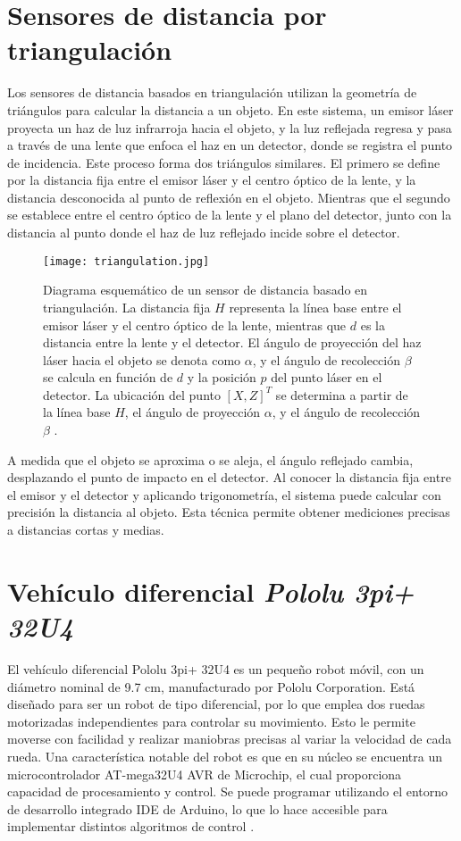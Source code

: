 \section{Sensores de distancia por triangulación}
Los sensores de distancia basados en triangulación utilizan la geometría de triángulos para calcular la distancia a un objeto. En este sistema, un emisor láser proyecta un haz de luz infrarroja hacia el objeto, y la luz reflejada regresa y pasa a través de una lente que enfoca el haz en un detector, donde se registra el punto de incidencia. Este proceso forma dos triángulos similares. El primero se define por la distancia fija entre el emisor láser y el centro óptico de la lente, y la distancia desconocida al punto de reflexión en el objeto. Mientras que el segundo se establece entre el centro óptico de la lente y el plano del detector, junto con la distancia al punto donde el haz de luz reflejado incide sobre el detector.

\begin{figure}[H]
	\centering
	\texttt{[image: triangulation.jpg]}
	\caption{Diagrama esquemático de un sensor de distancia basado en triangulación. La distancia fija $H$ representa la línea base entre el emisor láser y el centro óptico de la lente, mientras que $d$ es la distancia entre la lente y el detector. El ángulo de proyección del haz láser hacia el objeto se denota como $\alpha$, y el ángulo de recolección $\beta$ se calcula en función de $d$ y la posición $p$ del punto láser en el detector. La ubicación del punto $[X,Z]^T$ se determina  a partir de la línea base $H$, el ángulo de proyección $\alpha$, y el ángulo de recolección $\beta$ \cite{drouin2020}.}
	\label{fig:triangulation}
\end{figure}

A medida que el objeto se aproxima o se aleja, el ángulo reflejado cambia, desplazando el punto de impacto en el detector. Al conocer la distancia fija entre el emisor y el detector y aplicando trigonometría, el sistema puede calcular con precisión la distancia al objeto. Esta técnica permite obtener mediciones precisas a distancias cortas y medias.


\section{Vehículo diferencial \textit{Pololu 3pi+ 32U4}}
El vehículo diferencial Pololu 3pi+ 32U4 es un pequeño robot móvil, con un diámetro nominal de 9.7 cm, manufacturado por Pololu Corporation. Está diseñado para ser un robot de tipo diferencial, por lo que emplea dos ruedas motorizadas independientes para controlar su movimiento. Esto le permite moverse con facilidad y realizar maniobras precisas al variar la velocidad de cada rueda. Una característica notable del robot es que en su núcleo se encuentra un microcontrolador AT-mega32U4 AVR de Microchip, el cual proporciona capacidad de procesamiento y control. Se puede programar utilizando el entorno de desarrollo integrado IDE de Arduino, lo que lo hace accesible para implementar distintos algoritmos de control \cite{pololu}.  


